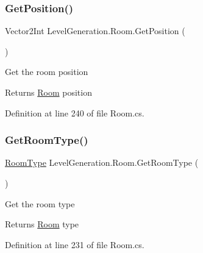 \subsubsection{\texorpdfstring{Get\+Position()}{GetPosition()}}
{\footnotesize\ttfamily Vector2\+Int Level\+Generation.\+Room.\+Get\+Position (\begin{DoxyParamCaption}{ }\end{DoxyParamCaption})}



Get the room position 

\begin{DoxyReturn}{Returns}
\mbox{\hyperlink{class_level_generation_1_1_room}{Room}} position
\end{DoxyReturn}


Definition at line 240 of file Room.\+cs.

\mbox{\label{class_level_generation_1_1_room_aff17f63f58338e84997627bcaed08afc}} 
\subsubsection{\texorpdfstring{Get\+Room\+Type()}{GetRoomType()}}
{\footnotesize\ttfamily \mbox{\hyperlink{namespace_level_generation_a206451e0c8bfced86ae4b9348cd3718f}{Room\+Type}} Level\+Generation.\+Room.\+Get\+Room\+Type (\begin{DoxyParamCaption}{ }\end{DoxyParamCaption})}



Get the room type 

\begin{DoxyReturn}{Returns}
\mbox{\hyperlink{class_level_generation_1_1_room}{Room}} type
\end{DoxyReturn}


Definition at line 231 of file Room.\+cs.

\mbox{\label{class_level_generation_1_1_room_a3c9be1844b28b37af37ab01e199361d0}} 

